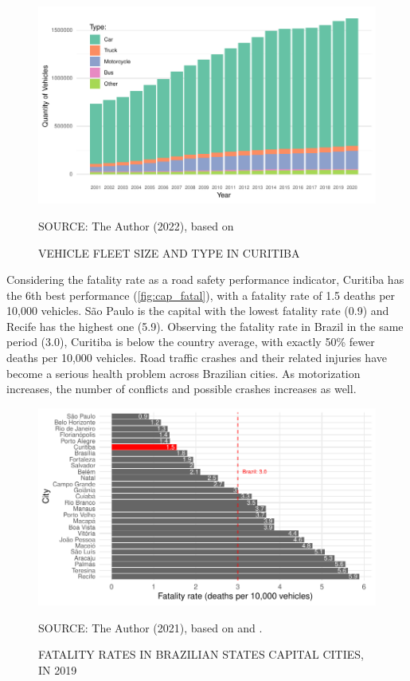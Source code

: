 \begin{figure}
    \centering\footnotesize
    \captionsetup{font=footnotesize}
    \caption{VEHICLE FLEET SIZE AND TYPE IN CURITIBA}
    \includegraphics{fig/cwb_fleet_type.pdf}
    \label{fig:cwb_fleet}
    \par SOURCE: The Author (2022), based on \textcite{DENATRAN2020}
\end{figure}

Considering the fatality rate as a road safety performance indicator, Curitiba has the 6th best performance (\autoref{fig:cap_fatal}), with a fatality rate of 1.5 deaths per 10,000 vehicles. São Paulo is the capital with the lowest fatality rate (0.9) and Recife has the highest one (5.9). Observing the fatality rate in Brazil in the same period (3.0), Curitiba is below the country average, with exactly 50\% fewer deaths per 10,000 vehicles. Road traffic crashes and their related injuries have become a serious health problem across Brazilian cities. As motorization increases, the number of conflicts and possible crashes increases as well.

\begin{figure}[!htbp]
    \centering\footnotesize
    \captionsetup{font=footnotesize}
    \caption{FATALITY RATES IN BRAZILIAN STATES CAPITAL CITIES, IN 2019}
    \includegraphics{fig/cap_fatal.pdf}
    \label{fig:cap_fatal}
    \par SOURCE: The Author (2021), based on \textcite{MinistryofHealth2020} and \textcite{DENATRAN2020}.
\end{figure} 

